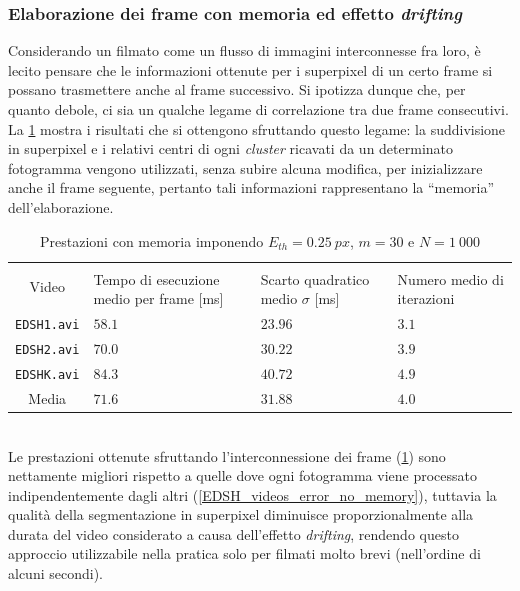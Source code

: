 \documentclass[12pt,a4paper,oneside]{article}
\begin{document}
\subsubsection{Elaborazione dei frame con memoria ed effetto \textit{drifting}}\label{Drifting_effect}
Considerando un filmato come un flusso di immagini interconnesse fra loro, è lecito pensare che le informazioni ottenute per i superpixel di un certo frame si possano trasmettere anche al frame successivo. Si ipotizza dunque che, per quanto debole, ci sia un qualche legame di correlazione tra due frame consecutivi. La \cref{EDSH_videos_error_memory} mostra i risultati che si ottengono sfruttando questo legame: la suddivisione in superpixel e i relativi centri di ogni \textit{cluster} ricavati da un determinato fotogramma vengono utilizzati, senza subire alcuna modifica, per inizializzare anche il frame seguente, pertanto tali informazioni rappresentano la ``memoria'' dell'elaborazione.
\begin{table}[!htb]
	\renewcommand{\arraystretch}{1.3}
	\centering
	\begin{tabular}{|c||>{\centering\arraybackslash}m{}|>{\centering\arraybackslash}m{}|>{\centering\arraybackslash}m{}|}
	    \hline
		\multirow{2}{*}{\vspace{-6ex}Video}
		& \multicolumn{3}{c|}{VideoSLIC}\\\cline{2-4}
		& Tempo di esecuzione medio per frame [ms] & Scarto quadratico medio $\sigma$ [ms] & Numero medio di iterazioni\\
		\hline\hline
		\texttt{EDSH1.avi} & $58.1$ & $23.96$ & $3.1$ \\\hline
		\texttt{EDSH2.avi} & $70.0$ & $30.22$ & $3.9$ \\\hline
		\texttt{EDSHK.avi} & $84.3$ & $40.72$ & $4.9$ \\\hline\hline
		Media              & $71.6$ & $31.88$ & $4.0$ \\\hline
	\end{tabular}
	\captionsetup{justification=centering}
	\caption{Prestazioni con memoria imponendo $E_{th} = 0.25~px$, $m = 30$ e $N = 1~000$}
	\label{EDSH_videos_error_memory}
\end{table}
\\Le prestazioni ottenute sfruttando l'interconnessione dei frame (\cref{EDSH_videos_error_memory}) sono nettamente migliori rispetto a quelle dove ogni fotogramma viene processato indipendentemente dagli altri (\cref{EDSH_videos_error_no_memory}), tuttavia la qualità della segmentazione in superpixel diminuisce proporzionalmente alla durata del video considerato a causa dell'effetto \textit{drifting}, rendendo questo approccio utilizzabile nella pratica solo per filmati molto brevi (nell'ordine di alcuni secondi).
\end{document}
